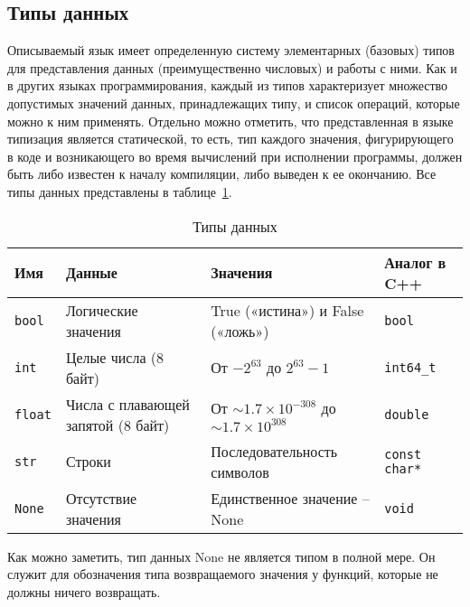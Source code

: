 \subsection{Типы данных}
\label{sec:data_types}

Описываемый язык имеет определенную систему элементарных (базовых) типов для представления данных (преимущественно числовых) и работы с ними.
Как и в других языках программирования, каждый из типов характеризует множество допустимых значений данных, принадлежащих типу, и список операций, которые можно к ним применять.
Отдельно можно отметить, что представленная в языке типизация является статической, то есть, тип каждого значения, фигурирующего в коде и возникающего во время вычислений при исполнении программы, должен быть либо известен к началу компиляции, либо выведен к ее окончанию.
Все типы данных представлены в таблице~\ref{tab:data_types}.

\begin{table}[h]
    \centering
    \caption{Типы данных}
    \label{tab:data_types}
    \begin{tabular}{lp{4cm}p{6cm}p{3cm}}
        \toprule
        \textbf{Имя} & \textbf{Данные}                    & \textbf{Значения}                                            & \textbf{Аналог в C++} \\
        \midrule
        \verb|bool|  & Логические значения                & True («истина») и False («ложь»)                             & \verb|bool|           \\
        \addlinespace
        \verb|int|   & Целые числа (8 байт)               & От \(-2^{63}\) до \(2^{63} - 1\)                             & \verb|int64_t|        \\
        \addlinespace
        \verb|float| & Числа с плавающей запятой (8 байт) & От $\sim 1.7 \times 10^{-308}$ до $\sim 1.7 \times 10^{308}$ & \verb|double|         \\
        \addlinespace
        \verb|str|   & Строки                             & Последовательность символов                                  & \verb|const char*|    \\
        \addlinespace
        \verb|None|  & Отсутствие значения                & Единственное значение -- None                                & \verb|void|           \\
        \bottomrule
    \end{tabular}
\end{table}

Как можно заметить, тип данных None не является типом в полной мере.
Он служит для обозначения типа возвращаемого значения у функций, которые не должны ничего возвращать.

